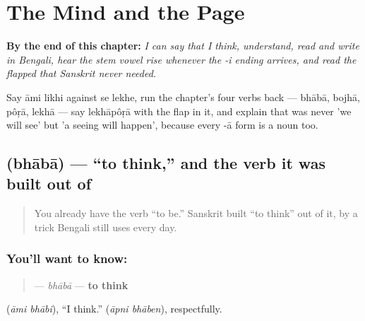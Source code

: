 
\chapter{The Mind and the Page}
\label{ch:bn-mind-and-page}

\begin{chapteropening}
\textbf{By the end of this chapter:} \emph{I can say that I think, understand, read and write in Bengali, hear the stem vowel rise whenever the -i ending arrives, and read the flapped  that Sanskrit never needed.}

Say āmi likhi against se lekhe, run the chapter's four verbs back — bhābā, bojhā, pôṛā, lekhā — say lekhāpôṛā with the flap in it, and explain that   was never 'we will see' but 'a seeing will happen', because every -ā form is a noun too.
\end{chapteropening}

\section[\texorpdfstring{\bn{ভাবা} (bhābā)}{ভাবা (bhābā)}]{ (bhābā) — \textquotedblleft{}to think,\textquotedblright{} and the verb it was built out of}

\label{lesson:BN-C08-bhaba}



\begin{quote}
You already have the verb \textquotedblleft{}to be.\textquotedblright{} Sanskrit built \textquotedblleft{}to think\textquotedblright{} out of it, by a trick Bengali still uses every day.
\end{quote}

\subsection*{You'll want to know: }
\begin{quote}
\textbf{} — \emph{bhābā} — \textbf{to think}
\end{quote}

  (\emph{āmi bhābi}), \textquotedblleft{}I think.\textquotedblright{}   (\emph{āpni bhāben}), respectfully.

